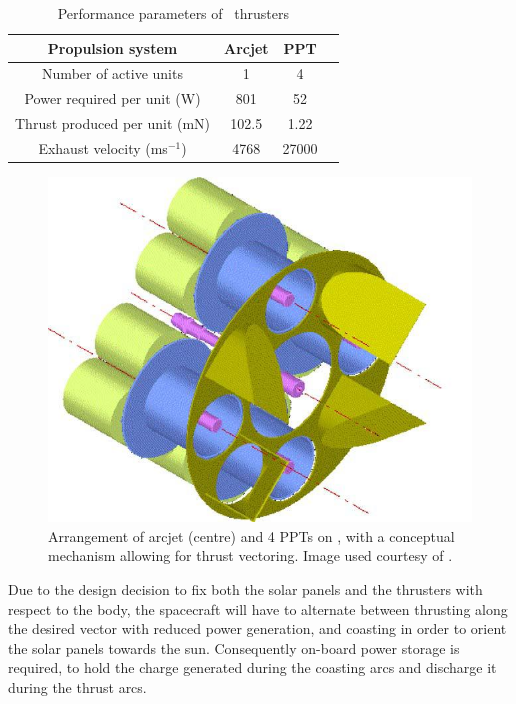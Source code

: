 \begin{table} [ht]
\caption{Performance parameters of \BW\ thrusters} \label{tab:BW1-performance}
\centering
\begin{tabular} {cccc}\toprule
  Propulsion system & Arcjet & PPT \\\midrule
  Number of active units & 1 & 4 \\
  Power required per unit (W) & 801 & 52\\
  Thrust produced per unit (mN) & 102.5 & 1.22\\
  Exhaust velocity (ms$^{-1}$) & 4768 & 27000\\\bottomrule
\end{tabular}
\end{table}

\begin{figure} [ht] 
\centering
\includegraphics[scale=0.25]{Images/thrust-vectoring.JPG}
\caption{Arrangement of arcjet (centre) and 4 PPTs on \BW, with a conceptual mechanism allowing for thrust vectoring. Image used courtesy of \textcite{Roeser2006}.} \label{fig:Thrust-vectoring}
\end{figure}

Due to the design decision to fix both the solar panels and the thrusters with respect to the body, the spacecraft will have to alternate between thrusting along the desired vector with reduced power generation, and coasting in order to orient the solar panels towards the sun. Consequently on-board power storage is required, to hold the charge generated during the coasting arcs and discharge it during the thrust arcs.

